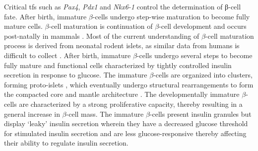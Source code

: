 Critical \glspl{tf} such as \textit{Pax4}, \textit{Pdx1} and \textit{Nkx6-1} control the determination of β-cell fate. %
 After birth, immature $\beta$-cells undergo step-wise maturation to become fully mature cells. $\beta$-cell maturation is continuation of $\beta$-cell development and occurs post-natally in mammals \textbf{\cite{barsby_maturation_2022}}. Most of the current understanding of $\beta$-cell maturation process is derived from neonatal rodent islets, as similar data from humans is difficult to collect \textbf{\cite{liu_all_2017, salinno_-cell_2019}}. After birth, immature $\beta$-cells undergo several steps to become fully mature and functional cells characterized by tightly controlled insulin secretion in response to glucose. The immature $\beta$-cells are organized into clusters, forming proto-islets \textbf{\cite{salinno_-cell_2019}}, which eventually undergo structural rearrangements to form the compacted core and mantle architecture \textbf{\cite{sharon_peninsular_2019}}. The developmentally immature $\beta$-cells are characterized by a strong proliferative capacity, thereby resulting in a general increase in $\beta$-cell mass. The immature $\beta$-cells present insulin granules but display `leaky' insulin secretion wherein they have a decreased glucose threshold for stimulated insulin secretion \textbf{\cite{liu_all_2017, blum_functional_2012}} and are less glucose-responsive thereby affecting their ability to regulate insulin secretion.\\%

